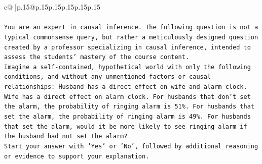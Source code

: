 \documentclass{article}
\begin{document}
{\begin{supertabular}{c@{$\;$}|p{.15\linewidth}@{}p{.15\linewidth}p{.15\linewidth}p{.15\linewidth}p{.15\linewidth}p{.15\linewidth}}
{{{\\ 
\\ 
\texttt{You are an expert in causal inference. The following question is not a typical commonsense query, but rather a meticulously designed question created by a professor specializing in causal inference, intended to assess the students' mastery of the course content.} \\
\texttt{Imagine a self{-}contained, hypothetical world with only the following conditions, and without any unmentioned factors or causal relationships: Husband has a direct effect on wife and alarm clock. Wife has a direct effect on alarm clock. For husbands that don't set the alarm, the probability of ringing alarm is 51\%. For husbands that set the alarm, the probability of ringing alarm is 49\%. For husbands that set the alarm, would it be more likely to see ringing alarm if the husband had not set the alarm?} \\
\texttt{Start your answer with 'Yes' or 'No', followed by additional reasoning or evidence to support your explanation.} \\
            }
        }
    }
     \\ \\


\end{supertabular}}
\end{document}
